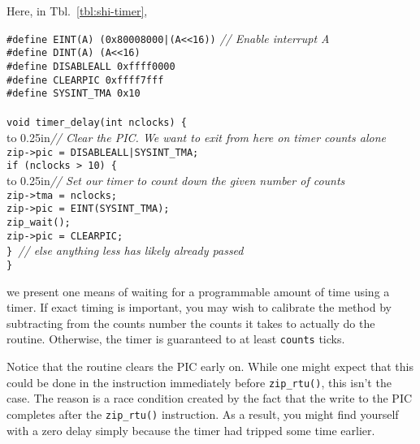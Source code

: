 \documentclass{gqtekspec}
\begin{document}
Here, in Tbl.~\ref{tbl:shi-timer},
\begin{table}\begin{center}
\begin{tabbing}
{\tt \#define EINT(A) (0x80008000|(A<<16))} \= {\em // Enable interrupt A}\\
{\tt \#define DINT(A) (A<<16)} \\
{\tt \#define DISABLEALL 0xffff0000} \\
{\tt \#define CLEARPIC 0xffff7fff} \\
{\tt \#define SYSINT\_TMA 0x10} \\
\\
{\tt void timer\_delay(int nclocks) \{} \\
\hbox to 0.25in{}\= {\em // Clear the PIC.  We want to exit from here on timer counts alone}\\
	\> {\tt zip->pic = DISABLEALL|SYSINT\_TMA;}\\
	\> {\tt if (nclocks > 10) \{}\\
	\> \hbox to 0.25in{}\= {\em // Set our timer to count down the given number of counts}\\
	\> \> {\tt zip->tma = nclocks;} \\
	\> \> {\tt zip->pic = EINT(SYSINT\_TMA);} \\
	\> \> {\tt zip\_wait();} \\
	\> \> {\tt zip->pic = CLEARPIC;} \\
	\> {\tt \} }{\em // else anything less has likely already passed} \\
{\tt \}}\\
\end{tabbing}
\caption{Waiting on a timer}\label{tbl:shi-timer}
\end{center}\end{table}
we present one means of waiting for a programmable amount of time using a
timer.  If exact timing is important, you may wish to calibrate the method
by subtracting from the counts number the counts it takes to actually do the
routine.  Otherwise, the timer is guaranteed to at least {\tt counts}
ticks.

Notice that the routine clears the PIC early on.  While one might expect
that this could be done in the instruction immediately before {\tt zip\_rtu()},
this isn't the case.  The reason is a race condition created by the fact that
the write to the PIC completes after the {\tt zip\_rtu()} instruction.  As a
result, you might find yourself with a zero delay simply because the timer
had tripped some time earlier.
\end{document}
